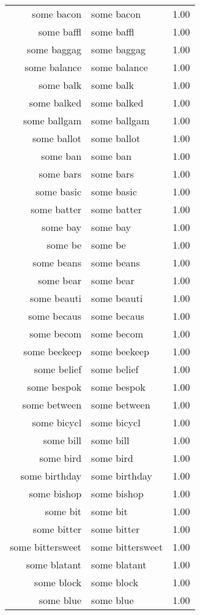 \begin{table}[ht]
\begin{tabular}{rlr}
  some bacon & some bacon & 1.00 \\ 
  some baffl & some baffl & 1.00 \\ 
  some baggag & some baggag & 1.00 \\ 
  some balance & some balance & 1.00 \\ 
  some balk & some balk & 1.00 \\ 
  some balked & some balked & 1.00 \\ 
  some ballgam & some ballgam & 1.00 \\ 
  some ballot & some ballot & 1.00 \\ 
  some ban & some ban & 1.00 \\ 
  some bars & some bars & 1.00 \\ 
  some basic & some basic & 1.00 \\ 
  some batter & some batter & 1.00 \\ 
  some bay & some bay & 1.00 \\ 
  some be & some be & 1.00 \\ 
  some beans & some beans & 1.00 \\ 
  some bear & some bear & 1.00 \\ 
  some beauti & some beauti & 1.00 \\ 
  some becaus & some becaus & 1.00 \\ 
  some becom & some becom & 1.00 \\ 
  some beekeep & some beekeep & 1.00 \\ 
  some belief & some belief & 1.00 \\ 
  some bespok & some bespok & 1.00 \\ 
  some between & some between & 1.00 \\ 
  some bicycl & some bicycl & 1.00 \\ 
  some bill & some bill & 1.00 \\ 
  some bird & some bird & 1.00 \\ 
  some birthday & some birthday & 1.00 \\ 
  some bishop & some bishop & 1.00 \\ 
  some bit & some bit & 1.00 \\ 
  some bitter & some bitter & 1.00 \\ 
  some bittersweet & some bittersweet & 1.00 \\ 
  some blatant & some blatant & 1.00 \\ 
  some block & some block & 1.00 \\ 
  some blue & some blue & 1.00 \\ 

\end{tabular}
\end{table}
